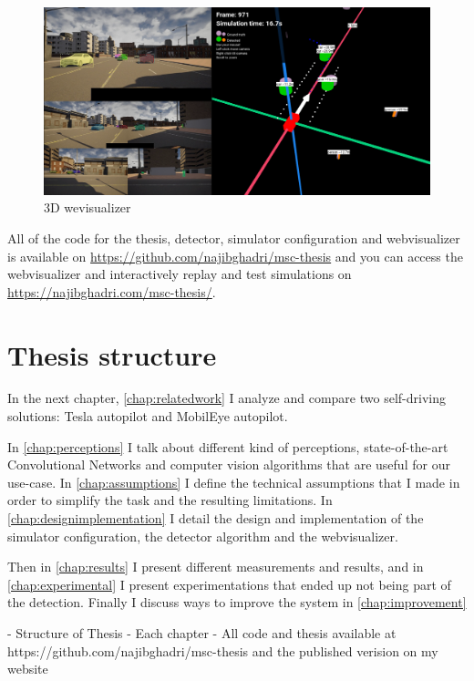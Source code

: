 \begin{figure}[!ht]
    \centering
    \includegraphics[width=150mm, keepaspectratio]{figures/webviz2.png}
    \caption{3D wevisualizer}
    \label{fig:webviz1}
\end{figure}

All of the code for the thesis, detector, simulator configuration and
webvisualizer is available on \url{https://github.com/najibghadri/msc-thesis}
and you can access the webvisualizer and interactively replay and test
simulations on \url{https://najibghadri.com/msc-thesis/}.


\section{Thesis structure}

In the next chapter, \autoref{chap:relatedwork} I analyze and
compare two self-driving solutions: Tesla autopilot and MobilEye autopilot.

In \autoref{chap:perceptions} I talk about different kind of perceptions,
state-of-the-art Convolutional Networks and computer vision algorithms that are
useful for our use-case. In \autoref{chap:assumptions} I define the technical
assumptions that I made in order to simplify the task and the resulting
limitations. In \autoref{chap:designimplementation} I detail the design and
implementation of the simulator configuration, the detector algorithm and the
webvisualizer.

Then in \autoref{chap:results} I present different measurements and results, and
in \autoref{chap:experimental} I present experimentations that ended up not
being part of the detection. Finally I discuss ways to improve the system in
\autoref{chap:improvement}

- Structure of Thesis
- Each chapter
- All code and thesis available at https://github.com/najibghadri/msc-thesis and the published verision on my website